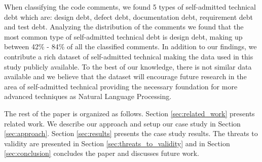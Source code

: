 
When classifying the code comments, we found 5 types of self-admitted technical debt which are: design debt, defect debt, documentation debt, requirement debt and test debt. Analyzing the distribution of the comments we found that the most common type of self-admitted technical debt is design debt, making up between 42\% - 84\% of all the classified comments. In addition to our findings, we contribute a rich dataset of self-admitted technical making the data used in this study publicly available. To the best of our knowledge, there is not similar data available and we believe that the dataset will encourage future research in the area of self-admitted technical providing the necessary foundation for more advanced techniques as Natural Language Processing.  


The rest of the paper is organized as follows. Section \ref{sec:related_work} presents related work. We describe our approach and setup our case study in Section \ref{sec:approach}. Section \ref{sec:results} presents the case study results. The threats to validity are presented in Section \ref{sec:threats_to_validity} and in Section \ref{sec:conclusion} concludes the paper and discusses future work. 